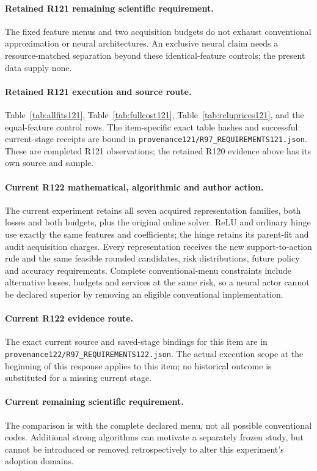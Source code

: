 \paragraph{Retained R121 remaining scientific requirement.}
The fixed feature menus and two acquisition budgets do not exhaust conventional approximation or neural architectures. An exclusive neural claim needs a resource-matched separation beyond these identical-feature controls; the present data supply none.

\paragraph{Retained R121 execution and source route.}
Table~\ref{tab:allfits121}, Table~\ref{tab:fullcost121}, Table~\ref{tab:reluprices121}, and the equal-feature control rows.
The item-specific exact table hashes and successful current-stage receipts are bound in \nolinkurl{provenance121/R97_REQUIREMENTS121.json}. These are completed R121 observations; the retained R120 evidence above has its own source and sample.
\paragraph{Current R122 mathematical, algorithmic and author action.}
The current experiment retains all seven acquired representation families, both losses and both budgets, plus the original online solver. ReLU and ordinary hinge use exactly the same features and coefficients; the hinge retains its parent-fit and audit acquisition charges. Every representation receives the new support-to-action rule and the same feasible rounded candidates, risk distributions, future policy and accuracy requirements. Complete conventional-menu constraints include alternative losses, budgets and services at the same risk, so a neural actor cannot be declared superior by removing an eligible conventional implementation.
\paragraph{Current R122 evidence route.}
The exact current source and saved-stage bindings for this item are in \nolinkurl{provenance122/R97_REQUIREMENTS122.json}. The actual execution scope at the beginning of this response applies to this item; no historical outcome is substituted for a missing current stage.
\paragraph{Current remaining scientific requirement.}
The comparison is with the complete declared menu, not all possible conventional codes. Additional strong algorithms can motivate a separately frozen study, but cannot be introduced or removed retrospectively to alter this experiment's adoption domains.

